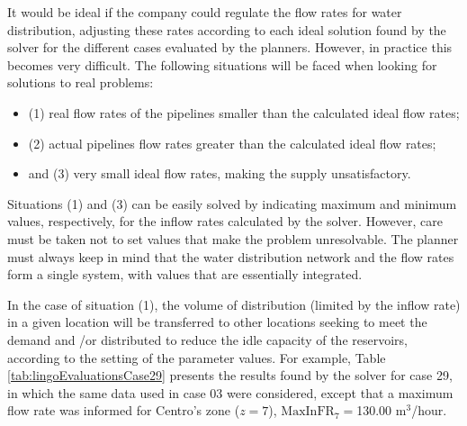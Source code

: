\documentclass{singlecol}
\theoremstyle{TH}{
\newtheorem{lemma}{Lemma}
\newtheorem{theorem}[lemma]{Theorem}
\newtheorem{corrolary}[lemma]{Corrolary}
\newtheorem{conjecture}[lemma]{Conjecture}
\newtheorem{proposition}[lemma]{Proposition}
\newtheorem{claim}[lemma]{Claim}
\newtheorem{stheorem}[lemma]{Wrong Theorem}
\newtheorem{algorithm}{Algorithm}
}
\theoremstyle{THrm}{
\newtheorem{definition}{Definition}[section]
\newtheorem{question}{Question}[section]
\newtheorem{remark}{Remark}
\newtheorem{scheme}{Scheme}
}
\theoremstyle{THhit}{
\newtheorem{case}{Case}[section]
}
\begin{document}
It would be ideal if the company could regulate the flow rates for water distribution, adjusting these rates according to each ideal solution found by the solver for the different cases evaluated by the planners. However, in practice this becomes very difficult. The following situations will be faced when looking for solutions to real problems:

\begin{itemize}
\item (1) real flow rates of the pipelines smaller than the calculated ideal flow rates;
\item (2) actual pipelines flow rates greater than the calculated ideal flow rates;
\item and (3) very small ideal flow rates, making the supply unsatisfactory.
\end{itemize}

Situations (1) and (3) can be easily solved by indicating maximum and minimum values, respectively, for the inflow rates calculated by the solver. However, care must be taken not to set values that make the problem unresolvable. The planner must always keep in mind that the water distribution network and the flow rates form a single system, with values that are essentially integrated.

In the case of situation (1), the volume of distribution (limited by the inflow rate) in a given location will be transferred to other locations seeking to meet the demand and \slash or distributed to reduce the idle capacity of the reservoirs, according to the setting of the parameter values. For example, Table \ref{tab:lingoEvaluationsCase29} presents the results found by the solver for case 29, in which the same data used in case 03 were considered, except that a maximum flow rate was informed for Centro's zone ($z = 7$), $\mathrm{MaxInFR}_7 = $130.00 $\mathrm{m^3}$/hour.
\end{document}
